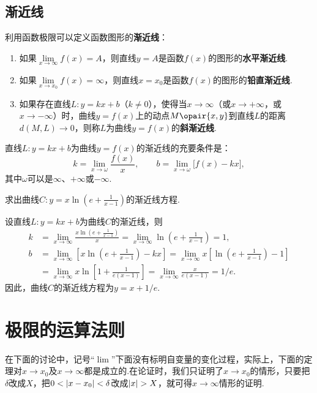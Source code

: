 \subsection{渐近线}
\begin{definition}
利用函数极限可以定义函数图形的\textbf{渐近线}：\begin{enumerate}
\item 如果\(\lim\limits_{x \to \infty}f(x) = A\)，则直线\(y = A\)是函数\(f(x)\)的图形的\textbf{水平渐近线}.
\item 如果\(\lim\limits_{x \to x_0}f(x) = \infty\)，则直线\(x = x_0\)是函数\(f(x)\)的图形的\textbf{铅直渐近线}.
\item 如果存在直线\(L: y = kx+b\)（\(k \neq 0\)），使得当\(x \to \infty\)（或\(x \to +\infty\)，或\(x \to -\infty\)）时，曲线\(y = f(x)\)上的动点\(M\opair{x,y}\)到直线\(L\)的距离\(d(M,L)\to0\)，则称\(L\)为曲线\(y = f(x)\)的\textbf{斜渐近线}.
\end{enumerate}
\end{definition}

\begin{theorem}
直线\(L: y = kx+b\)为曲线\(y = f(x)\)的渐近线的充要条件是：\[
k = \lim\limits_{x \to \omega} \frac{f(x)}{x},
\qquad
b = \lim\limits_{x \to \omega} \bigl[ f(x) - kx \bigr],
\]其中\(\omega\)可以是\(\infty\)、\(+\infty\)或\(-\infty\).
\end{theorem}

\begin{example}
求出曲线\(C: y = x \ln\left(e+\frac{1}{x-1}\right)\)的渐近线方程.
\begin{solution}
设直线\(L: y = kx+b\)为曲线\(C\)的渐近线，则\begin{align*}
k &= \lim\limits_{x\to\infty} \frac{x \ln\left(e+\frac{1}{x-1}\right)}{x}
= \lim\limits_{x\to\infty} \ln\left(e+\frac{1}{x-1}\right)
= 1, \\
b &= \lim\limits_{x\to\infty} \left[ x \ln\left(e+\frac{1}{x-1}\right) - kx \right]
= \lim\limits_{x\to\infty} x \left[ \ln\left(e+\frac{1}{x-1}\right) - 1 \right] \\
&= \lim\limits_{x\to\infty} x \ln\left[1+\frac{1}{e(x-1)}\right]
= \lim\limits_{x\to\infty} \frac{x}{e(x-1)}
= 1/e.
\end{align*}
因此，曲线\(C\)的渐近线方程为\(y = x + 1/e\).
\end{solution}
\end{example}

\section{极限的运算法则}
在下面的讨论中，记号“\(\lim\)”下面没有标明自变量的变化过程，实际上，下面的定理对\(x \to x_0\)及\(x \to \infty\)都是成立的.在论证时，我们只证明了\(x \to x_0\)的情形，只要把\(\delta\)改成\(X\)，把\(0<\abs{x-x_0}<\delta\)改成\(\abs{x}>X\)，就可得\(x \to \infty\)情形的证明.

